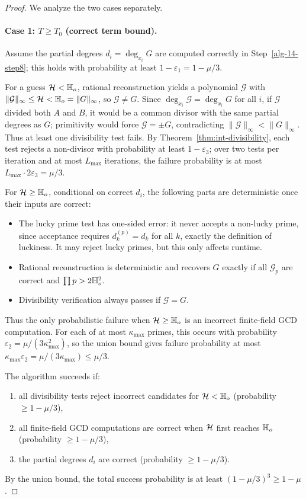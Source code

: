 \documentclass{article}
\numberwithin{equation}{section}
\begin{document}
\begin{proof}
We analyze the two cases separately.

\paragraph{Case 1: $T \ge T_0$ (correct term bound).}

Assume the partial degrees $d_i = \deg_{x_i} G$ are computed correctly in Step~\ref{alg-14-step8}; this holds with probability at least $1 - \varepsilon_1 = 1 - \mu/3$.

For a guess ${\mathcal{H}} < \mathbb{H}_{o}$, rational reconstruction yields a polynomial $\mathcal{G}$ with $\|\mathcal{G}\|_\infty \le {\mathcal{H}} < \mathbb{H}_{o} = \|G\|_\infty$, so $\mathcal{G} \ne G$. Since $\deg_{x_i}\mathcal{G} = \deg_{x_i}G$ for all $i$, if $\mathcal{G}$ divided both $A$ and $B$, it would be a common divisor with the same partial degrees as $G$; primitivity would force $\mathcal{G} = \pm G$, contradicting $\|\mathcal{G}\|_\infty < \|G\|_\infty$. Thus at least one divisibility test fails. By Theorem~\ref{thm:int-divisibility}, each test rejects a non-divisor with probability at least $1-\varepsilon_3$; over two tests per iteration and at most $L_{\max}$ iterations, the failure probability is at most $L_{\max} \cdot 2\varepsilon_3 = \mu/3$.

For ${\mathcal{H}} \ge \mathbb{H}_{o}$, conditional on correct $d_i$, the following parts are deterministic once their inputs are correct:
\begin{itemize}
    \item The lucky prime test has one-sided error: it never accepts a non-lucky prime, since acceptance requires $d_k^{(p)} = d_k$ for all $k$, exactly the definition of luckiness. It may reject lucky primes, but this only affects runtime.
    \item Rational reconstruction is deterministic and recovers $G$ exactly if all $\mathcal{G}_p$ are correct and $\prod p > 2\mathbb{H}_{o}^2$.
    \item Divisibility verification always passes if $\mathcal{G} = G$.
\end{itemize}
Thus the only probabilistic failure when ${\mathcal{H}} \ge \mathbb{H}_{o}$ is an incorrect finite-field GCD computation. For each of at most $\kappa_{\max}$ primes, this occurs with probability $\varepsilon_2 = \mu/(3\kappa_{\max}^2)$, so the union bound gives failure probability at most $\kappa_{\max}\varepsilon_2 = \mu/(3\kappa_{\max}) \le \mu/3$.

The algorithm succeeds if:
\begin{enumerate}
    \item all divisibility tests reject incorrect candidates for ${\mathcal{H}} < \mathbb{H}_{o}$ (probability $\ge 1-\mu/3$),
    \item all finite-field GCD computations are correct when ${\mathcal{H}}$ first reaches $\mathbb{H}_{o}$ (probability $\ge 1-\mu/3$),
    \item the partial degrees $d_i$ are correct (probability $\ge 1-\mu/3$).
\end{enumerate}
By the union bound, the total success probability is at least $(1-\mu/3)^3 \ge 1-\mu$.




\end{proof}
\end{document}
